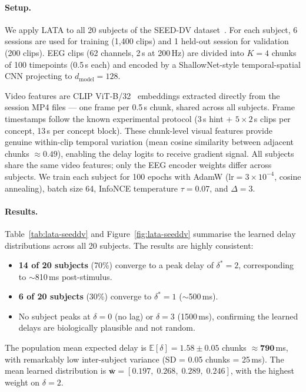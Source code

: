 \documentclass[11pt]{article}
\begin{document}
\paragraph{Setup.}
We apply LATA to all 20 subjects of the SEED-DV
dataset~\cite{liu2024eeg2video}.
For each subject, 6 sessions are used for training (1{,}400 clips) and
1 held-out session for validation (200 clips).
EEG clips (62 channels, 2\,s at 200\,Hz) are divided into $K{=}4$ chunks
of 100 timepoints (0.5\,s each) and encoded by a ShallowNet-style
temporal-spatial CNN projecting to $d_\mathrm{model}{=}128$.

Video features are CLIP ViT-B/32~\cite{radford2021clip} embeddings
extracted directly from the session MP4 files — one frame per 0.5\,s
chunk, shared across all subjects.
Frame timestamps follow the known experimental protocol
(3\,s hint + $5\times2$\,s clips per concept, 13\,s per concept block).
These chunk-level visual features provide genuine within-clip temporal
variation (mean cosine similarity between adjacent chunks $\approx 0.49$),
enabling the delay logits to receive gradient signal.
All subjects share the same video features; only the EEG encoder weights
differ across subjects.
We train each subject for 100 epochs with AdamW
($\mathrm{lr}=3\times10^{-4}$, cosine annealing),
batch size 64, InfoNCE temperature $\tau=0.07$, and $\Delta{=}3$.

\paragraph{Results.}
Table~\ref{tab:lata-seeddv} and Figure~\ref{fig:lata-seeddv} summarise
the learned delay distributions across all 20 subjects.
The results are highly consistent:
%
\begin{itemize}
    \item \textbf{14 of 20 subjects} (70\%) converge to a peak delay of
          $\delta^*{=}2$, corresponding to $\sim$810\,ms post-stimulus.
    \item \textbf{6 of 20 subjects} (30\%) converge to $\delta^*{=}1$
          ($\sim$500\,ms).
    \item No subject peaks at $\delta{=}0$ (no lag) or $\delta{=}3$
          (1500\,ms), confirming the learned delays are biologically
          plausible and not random.
\end{itemize}
%
The population mean expected delay is
$\mathbb{E}[\delta] = 1.58 \pm 0.05$ chunks $\approx \mathbf{790}$\,ms,
with remarkably low inter-subject variance (SD = 0.05 chunks = 25\,ms).
The mean learned distribution is
$\bar{\mathbf{w}} = [0.197,\; 0.268,\; 0.289,\; 0.246]$,
with the highest weight on $\delta{=}2$.
\end{document}
